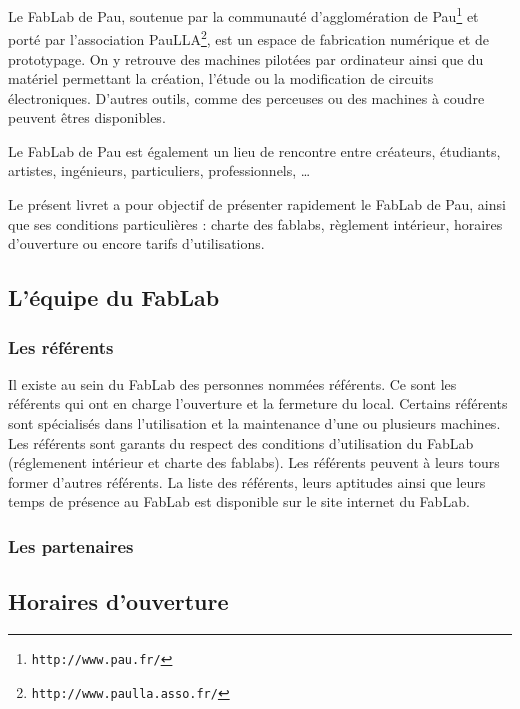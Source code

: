 Le FabLab de Pau, soutenue par la communauté d'agglomération de Pau\footnote{\texttt{http://www.pau.fr/}} et porté par l'association PauLLA\footnote{\texttt{http://www.paulla.asso.fr/}}, est un espace de fabrication numérique et de prototypage. On y retrouve des machines pilotées par ordinateur ainsi que du matériel permettant la création, l'étude  ou la modification de circuits électroniques. D'autres outils, comme des perceuses ou des machines à coudre peuvent êtres disponibles.

Le FabLab de Pau est également un lieu de rencontre entre créateurs, étudiants, artistes, ingénieurs, particuliers, professionnels, \dots 

Le présent livret a pour objectif de présenter rapidement le FabLab de Pau, ainsi que ses conditions particulières : charte des fablabs, règlement intérieur, horaires d'ouverture ou encore tarifs d'utilisations.


\subsection{L'équipe du FabLab}
\subsubsection{Les référents}
Il existe au sein du FabLab des personnes nommées référents.
Ce sont les référents qui ont en charge l'ouverture et la fermeture du local.
Certains référents sont spécialisés dans l'utilisation et la maintenance d'une ou plusieurs machines.
Les référents sont garants du respect des conditions d'utilisation du FabLab (réglemenent intérieur et charte des fablabs).
Les référents peuvent à leurs tours former d'autres référents.
La liste des référents, leurs aptitudes ainsi que leurs temps de présence au FabLab est disponible sur le site internet du FabLab. %

\subsubsection{Les partenaires}

\subsection{Horaires d'ouverture}
